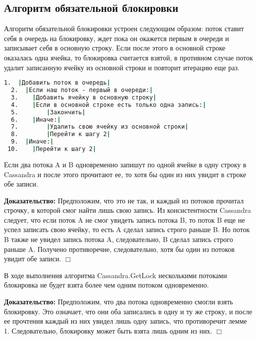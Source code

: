 \subsection{Алгоритм обязательной блокировки}

Алгоритм обязательной блокировки устроен следующим образом: поток ставит себя в очередь на блокировку, ждет пока он окажется первым в очереди и записывает себя в основную строку. Если после этого в основной строке оказалась одна ячейка, то блокировка считается взятой, в противном случае поток удалит записанную ячейку из основной строки и повторит итерацию еще раз.

\begin{lstlisting}[language=csh,caption={Алгоритм Cassandra.GetLock(lockId, threadId)}]
  1.  |Добавить поток в очередь|
  2.  |Если наш поток - первый в очереди:|
  3.  	|Добавить ячейку в основную строку|
  4.  	|Если в основной строке есть только одна запись:|
  5.  		|Закончить|
  6.  	|Иначе:|
  7.  		|Удалить свою ячейку из основной строки|
  8.  		|Перейти к шагу 2|
  9.  |Иначе:|
 10.  	|Перейти к шагу 2|

\end{lstlisting}

\begin{lemma}
Если два потока A и B одновременно запишут по одной ячейке в одну строку в Cassandra и после этого прочитают ее, то хотя бы один из них увидит в строке обе записи.
\end{lemma}
\textbf{Доказательство:}
Предположим, что это не так, и каждый из потоков прочитал строчку, в которой смог найти лишь свою запись. Из консистентности Cassandra следует, что если поток A не смог увидеть запись потока B, то поток B еще не успел записать свою ячейку, то есть A сделал запись строго раньше B. Но поток B также не увидел запись потока A, следовательно, B сделал запись строго раньше A. Получено противоречие, следовательно, хотя бы один из потоков увидит обе записи.
$\Box$

\begin{theorem}
В ходе выполнения алгоритма Cassandra.GetLock несколькими потоками блокировка не будет взята более чем одним потоком одновременно.
\end{theorem}
\textbf{Доказательство:}
Предположим, что два потока одновременно смогли взять блокировку. Это означает, что они оба записались в одну и ту же строку, и после ее прочтения каждый из них увидел лишь одну запись, что противоречит лемме 1. Следовательно, блокировку может быть взята лишь одним из них.
$\Box$

